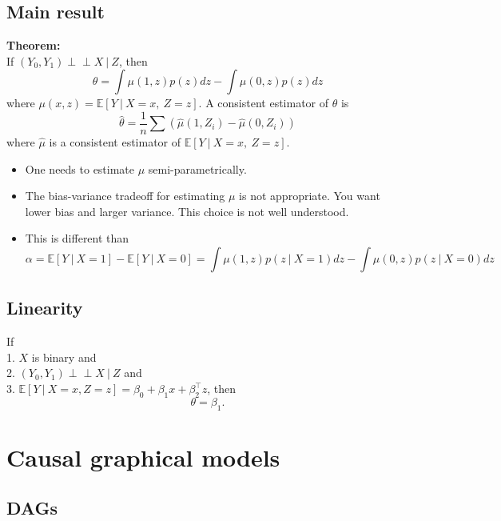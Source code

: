 \documentclass[]{article}
\begin{document}
\hypertarget{main-result}{%
\subsection{Main result}\label{main-result}}

\textbf{Theorem:}\\
If \((Y_0,Y_1) \perp\!\!\!\perp X \ \vert\ Z\), then \[
\theta = \int \mu(1,z)p(z)dz - \int \mu(0,z)p(z)dz
\] where \(\mu(x,z) = \mathbb{E}\left[ Y\ \vert\ X=x,\ Z=z \right]\). A
consistent estimator of \(\theta\) is \[
\widehat{\theta} = \frac{1}{n}\sum \left(\widehat{\mu}(1,Z_i) - \widehat{\mu}(0,Z_i)\right)
\] where \(\widehat{\mu}\) is a consistent estimator of
\(\mathbb{E}\left[ Y\ \vert\ X=x,\ Z=z \right]\).

\begin{itemize}
\item
  One needs to estimate \(\mu\) semi-parametrically.
\item
  The bias-variance tradeoff for estimating \(\mu\) is not appropriate.
  You want lower bias and larger variance. This choice is not well
  understood.
\item
  This is different than \[
  \alpha = \mathbb{E}\left[ Y\ \vert\ X=1 \right] - \mathbb{E}\left[ Y\ \vert\ X=0 \right] = \int \mu(1,z)p(z\ \vert\ X=1)dz - \int \mu(0,z)p(z\ \vert\ X=0)dz
  \]
\end{itemize}

\hypertarget{linearity}{%
\subsection{Linearity}\label{linearity}}

If\\
1. \(X\) is binary and\\
2. \((Y_0,Y_1) \perp\!\!\!\perp X \ \vert\ Z\) and\\
3.
\(\mathbb{E}\left[ Y\ \vert\ X=x, Z=z \right] = \beta_0 + \beta_1 x + \beta_2^\top z\),
then \[
\theta = \beta_1.
\]

\hypertarget{causal-graphical-models}{%
\section{Causal graphical models}\label{causal-graphical-models}}

\hypertarget{dags}{%
\subsection{DAGs}\label{dags}}
\end{document}
